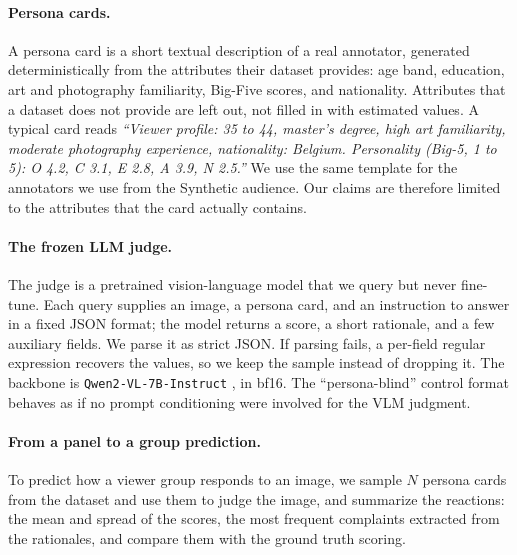 \documentclass{article}
\begin{document}
\paragraph{Persona cards.} A persona card is a short textual description of a real annotator, generated deterministically from the attributes their dataset provides: age band, education, art and photography familiarity, Big-Five scores, and nationality. Attributes that a dataset does not provide are left out, not filled in with estimated values. A typical card reads \emph{``Viewer profile: 35 to 44, master's degree, high art familiarity, moderate photography experience, nationality: Belgium. Personality (Big-5, 1 to 5): O 4.2, C 3.1, E 2.8, A 3.9, N 2.5.''} We use the same template for the annotators we use from the Synthetic audience. Our claims are therefore limited to the attributes that the card actually contains.
\paragraph{The frozen LLM judge.} The judge is a pretrained vision-language model that we query but never fine-tune. Each query supplies an image, a persona card, and an instruction to answer in a fixed JSON format; the model returns a score, a short rationale, and a few auxiliary fields. We parse it as strict JSON. If parsing fails, a per-field regular expression recovers the values, so we keep the sample instead of dropping it.  The backbone is \texttt{Qwen2-VL-7B-Instruct} \citep{wang2024qwen2vl}, in bf16. The “persona-blind” control format behaves as if no prompt conditioning were involved for the VLM judgment.
\paragraph{From a panel to a group prediction.} To predict how a viewer group responds to an image, we sample $N$ persona cards from the dataset and use them to judge the image, and summarize the reactions: the mean and spread of the scores, the most frequent complaints extracted from the rationales, and compare them with the ground truth scoring.
\end{document}
